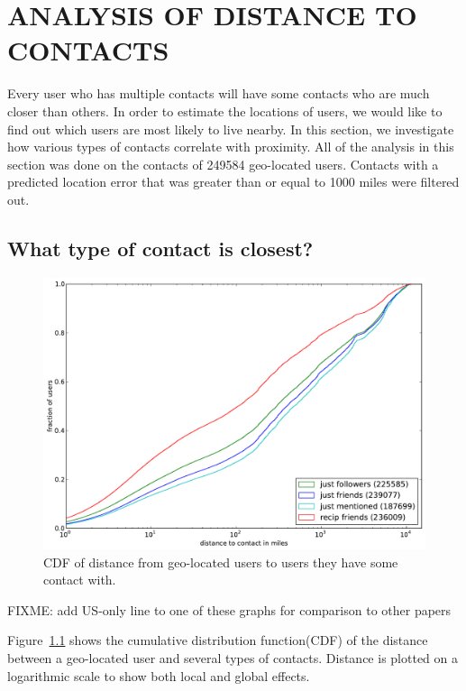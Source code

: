 
\chapter{\uppercase{Analysis of Distance to Contacts}}

Every user who has multiple contacts will have some contacts who are much
closer than others. In order to estimate the locations of users, we would like
to find out which users are most likely to live nearby.  In this section, we
investigate how various types of contacts correlate with proximity.
All of the analysis in this section was done on the contacts of 249584 geo-located users.
Contacts with a predicted location error that was greater than or equal to 1000
miles were filtered out.

\section{What type of contact is closest?}
\label{sec:EdgeTypes}

\begin{figure}[tb]
\centering
\includegraphics[width=\linewidth]{figures/edge_types_cuml.pdf}
\caption{
CDF of distance from geo-located users to users they have some contact
with.
}
\label{fig:EdgeTypesCum}
\end{figure}

FIXME: add US-only line to one of these graphs for comparison to other papers

Figure~\ref{fig:EdgeTypesCum} shows the cumulative distribution
function(CDF) of the distance between a geo-located user and several types of
contacts.
Distance is plotted on a logarithmic scale to show both local and
global effects.

